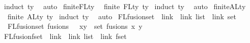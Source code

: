 \begin{isabellebody}
\isatagproof
{}\isamarkupfalse%
\ {\isacharparenleft}{\kern0pt}induct\ ty{\isacharparenright}{\kern0pt}\ \isamarkupfalse%
\ auto%
\endisatagproof
{\isafoldproof}%
%
\isadelimproof
\isanewline
%
\endisadelimproof
\isanewline
\isanewline
{}\isamarkupfalse%
\ finite{\isacharunderscore}{\kern0pt}FLty{\isacharcolon}{\kern0pt}\isanewline
\ \ {\isachardoublequoteopen}finite\ {\isacharparenleft}{\kern0pt}FLty\ ty{\isacharparenright}{\kern0pt}{\isachardoublequoteclose}\isanewline
%
\isadelimproof
%
\endisadelimproof
%
\isatagproof
{}\isamarkupfalse%
\ {\isacharparenleft}{\kern0pt}induct\ ty{\isacharparenright}{\kern0pt}\ \isamarkupfalse%
\ auto%
\endisatagproof
{\isafoldproof}%
%
\isadelimproof
\isanewline
%
\endisadelimproof
\isanewline
{}\isamarkupfalse%
\ finite{\isacharunderscore}{\kern0pt}ALty{\isacharcolon}{\kern0pt}\isanewline
\ \ {\isachardoublequoteopen}finite\ {\isacharparenleft}{\kern0pt}ALty\ ty{\isacharparenright}{\kern0pt}{\isachardoublequoteclose}\isanewline
%
\isadelimproof
%
\endisadelimproof
%
\isatagproof
{}\isamarkupfalse%
\ {\isacharparenleft}{\kern0pt}induct\ ty{\isacharparenright}{\kern0pt}\ \isamarkupfalse%
\ auto%
\endisatagproof
{\isafoldproof}%
%
\isadelimproof
\isanewline
%
\endisadelimproof
\isanewline
\isanewline
\isanewline
{}\isamarkupfalse%
\ FLfusion{\isacharunderscore}{\kern0pt}set\ {\isacharcolon}{\kern0pt}{\isacharcolon}{\kern0pt}\ {\isachardoublequoteopen}{\isacharparenleft}{\kern0pt}link\ {\isacharasterisk}{\kern0pt}\ link{\isacharparenright}{\kern0pt}\ list\ {\isacharequal}{\kern0pt}{\isachargreater}{\kern0pt}\ link\ set{\isachardoublequoteclose}\ \isanewline
\ \ {\isachardoublequoteopen}FLfusion{\isacharunderscore}{\kern0pt}set\ fusions\ {\isacharequal}{\kern0pt}{\isacharequal}{\kern0pt}\ {\isasymUnion}\ {\isacharparenleft}{\kern0pt}x{\isacharcomma}{\kern0pt}y{\isacharparenright}{\kern0pt}\ {\isasymin}\ set\ fusions{\isachardot}{\kern0pt}\ {\isacharbraceleft}{\kern0pt}x{\isacharcomma}{\kern0pt}\ y{\isacharbraceright}{\kern0pt}{\isachardoublequoteclose}\isanewline
\isanewline
\isanewline
\isanewline
{}\isamarkupfalse%
\ FLfusion{\isacharunderscore}{\kern0pt}fset\ {\isacharcolon}{\kern0pt}{\isacharcolon}{\kern0pt}\ {\isachardoublequoteopen}{\isacharparenleft}{\kern0pt}link\ {\isacharasterisk}{\kern0pt}\ link{\isacharparenright}{\kern0pt}\ list\ {\isacharequal}{\kern0pt}{\isachargreater}{\kern0pt}\ link\ fset{\isachardoublequoteclose}\ \isanewline

\end{isabellebody}
